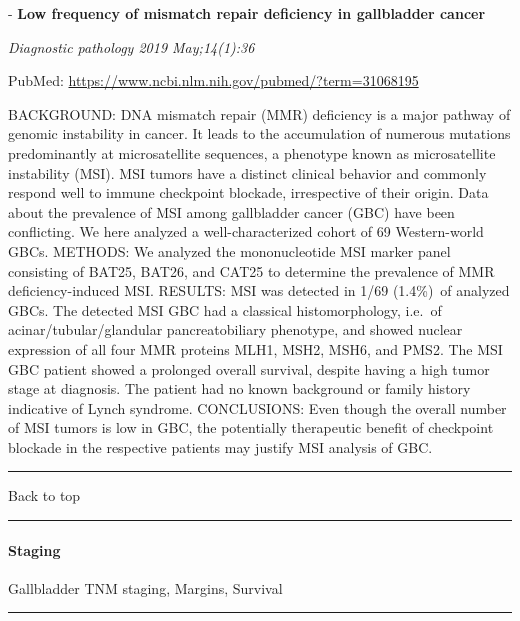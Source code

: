 \documentclass[]{article}
\let\oldparagraph\paragraph
\renewcommand{\paragraph}[1]{\oldparagraph{#1}\mbox{}}
\begin{document}
 - \textbf{Low frequency of mismatch repair deficiency in gallbladder
cancer}

\emph{Diagnostic pathology 2019 May;14(1):36}

PubMed: \url{https://www.ncbi.nlm.nih.gov/pubmed/?term=31068195}

BACKGROUND: DNA mismatch repair (MMR) deficiency is a major pathway of
genomic instability in cancer. It leads to the accumulation of numerous
mutations predominantly at microsatellite sequences, a phenotype known
as microsatellite instability (MSI). MSI tumors have a distinct clinical
behavior and commonly respond well to immune checkpoint blockade,
irrespective of their origin. Data about the prevalence of MSI among
gallbladder cancer (GBC) have been conflicting. We here analyzed a
well-characterized cohort of 69 Western-world GBCs. METHODS: We analyzed
the mononucleotide MSI marker panel consisting of BAT25, BAT26, and
CAT25 to determine the prevalence of MMR deficiency-induced MSI.
RESULTS: MSI was detected in 1/69 (1.4\%)~of analyzed GBCs. The detected
MSI GBC had a classical histomorphology, i.e.~of
acinar/tubular/glandular pancreatobiliary phenotype, and showed nuclear
expression of all four MMR proteins MLH1, MSH2, MSH6, and PMS2. The MSI
GBC patient showed a prolonged overall survival, despite having a high
tumor stage at diagnosis. The patient had no known background or family
history indicative of Lynch syndrome. CONCLUSIONS: Even though the
overall number of MSI tumors is low in GBC, the potentially therapeutic
benefit of checkpoint blockade in the respective patients may justify
MSI analysis of GBC.

{}

{}

\begin{center}\rule{0.5\linewidth}{\linethickness}\end{center}

Back to top

\begin{center}\rule{0.5\linewidth}{\linethickness}\end{center}

\pagebreak

\hypertarget{staging-2}{%
\paragraph{Staging}\label{staging-2}}

Gallbladder TNM staging, Margins, Survival

\begin{center}\rule{0.5\linewidth}{\linethickness}\end{center}
\end{document}

